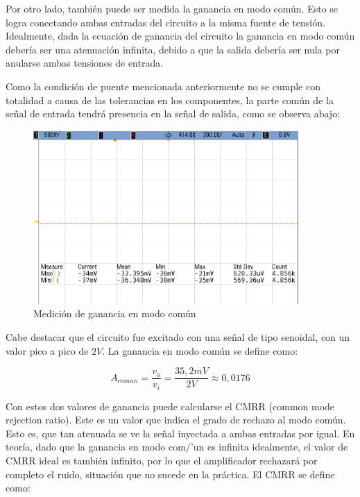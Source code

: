 Por otro lado, tambi\'en puede ser medida la ganancia en modo com\'un. Esto se logra conectando ambas entradas del circuito a la misma fuente de tensi\'on. Idealmente, dada la ecuaci\'on de ganancia del circuito la ganancia en modo com\'un deber\'ia ser una atenuaci\'on infinita, debido a que la salida deber\'ia ser nula por anularse ambas tensiones de entrada.

Como la condici\'on de puente mencionada anteriormente no se cumple con totalidad a causa de las tolerancias en los componentes, la parte com\'un de la se\~nal de entrada tendr\'a presencia en la se\~nal de salida, como se observa abajo:

\begin{figure}[H]
    \centering
    \includegraphics[width=0.9\textwidth]{../EJ4/resources/commode_med.png}
	\caption{Medici\'on de ganancia en modo com\'un}
   	\label{fig:EJ4_commodegain}
\end{figure}

Cabe destacar que el circuito fue excitado con una se\~nal de tipo senoidal, con un valor pico a pico de $2V$. La ganancia en modo com\'un se define como:

\begin{equation}
A_{comun} = \frac{v_o}{v_i} = \frac{35,2 mV}{2 V} \approx 0,0176
\end{equation}

Con estos dos valores de ganancia puede calcularse el CMRR (common mode rejection ratio). Este es un valor que indica el grado de rechazo al modo com\'un. Esto es, que tan atenuada se ve la se\~nal inyectada a ambas entradas por igual. En teor\'ia, dado que la ganancia en modo com/'un es infinita idealmente, el valor de CMRR ideal es también infinito, por lo que el amplificador rechazar\'a por completo el ruido, situaci\'on que no sucede en la pr\'actica. El CMRR se define como:

